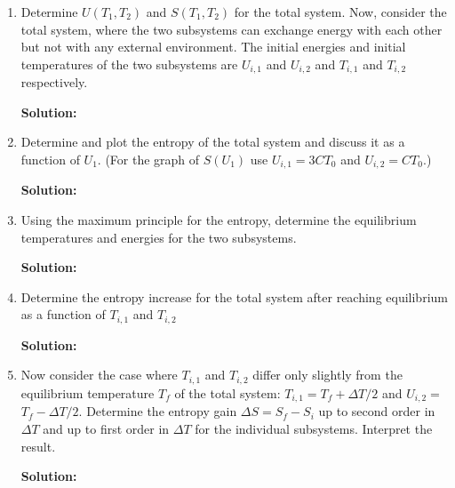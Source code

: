 \documentclass[10pt]{article}
\newenvironment{Solution}
    {\textbf{Solution:}
    
    \vspace{5mm}
    \begin{tcolorbox}
    }
    {
    \end{tcolorbox}
    \vspace{5mm}
    }
\begin{document}
\begin{enumerate}
\begin{enumerate}
\begin{Solution}
\end{Solution}

\item Determine $U\left(T_{1}, T_{2}\right)$ and $S\left(T_{1}, T_{2}\right)$ for the total system.
Now, consider the total system, where the two subsystems can exchange energy with each other but not with any external environment. The initial energies and initial temperatures of the two subsystems are $U_{i, 1}$ and $U_{i, 2}$ and $T_{i, 1}$ and $T_{i, 2}$ respectively.

\begin{Solution}


\end{Solution}

\item Determine and plot the entropy of the total system and discuss it as a function of $U_{1}$. (For the graph of $S\left(U_{1}\right)$ use $U_{i, 1}=3 C T_{0}$ and $U_{i, 2}=C T_{0}$.)

\begin{Solution}


\end{Solution}

\item Using the maximum principle for the entropy, determine the equilibrium temperatures and energies for the two subsystems.

\begin{Solution}


\end{Solution}

\item Determine the entropy increase for the total system after reaching equilibrium as a function of $T_{i, 1}$ and $T_{i, 2}$

\begin{Solution}


\end{Solution}

\item Now consider the case where $T_{i, 1}$ and $T_{i, 2}$ differ only slightly from the equilibrium temperature $T_{f}$ of the total system: $T_{i, 1}=T_{f}+\Delta T / 2$ and $U_{i, 2}=$ $T_{f}-\Delta T / 2 .$ Determine the entropy gain $\Delta S=S_{f}-S_{i}$ up to second order in $\Delta T$ and $\mathrm{up}$ to first order in $\Delta T$ for the individual subsystems. Interpret the result.

\begin{Solution}



\end{Solution}
\end{enumerate}
\end{enumerate}
\end{document}
